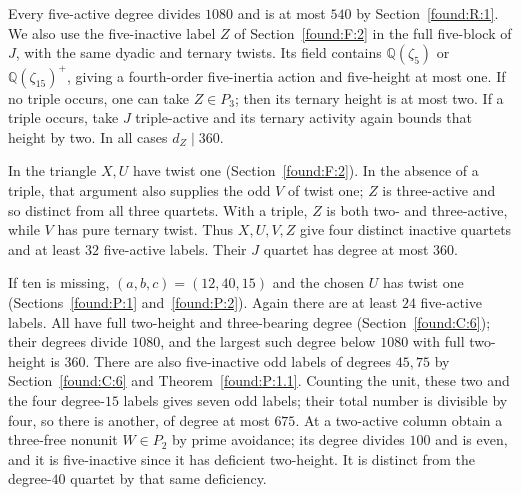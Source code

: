 \documentclass[11pt,a4paper]{article}
\numberwithin{equation}{section}
\theoremstyle{remark}
\begin{document}
Every five-active degree divides $1080$ and is at most $540$ by Section~\ref{found:R:1}. We also use the five-inactive label $Z$ of Section~\ref{found:F:2} in the full five-block of $J$, with
the same dyadic and ternary twists. Its field contains $\mathbb Q(\zeta_5)$
or $\mathbb Q(\zeta_{15})^+$, giving a fourth-order five-inertia action and
five-height at most one. If no triple occurs, one can take $Z\in P_3$;
then its ternary height is at most two. If a triple occurs, take $J$
triple-active and its ternary activity again bounds that height by two.
In all cases $d_Z\mid360$.

In the triangle $X,U$ have twist one (Section~\ref{found:F:2}). In the absence of a
triple, that argument also supplies the odd $V$ of twist one; $Z$ is
three-active and so distinct from all three quartets. With a triple,
$Z$ is both two- and three-active, while $V$ has pure ternary twist.
Thus $X,U,V,Z$ give four distinct inactive quartets and at least $32$
five-active labels. Their $J$ quartet has degree at most $360$.

If ten is missing, $(a,b,c)=(12,40,15)$ and the chosen $U$ has twist
one (Sections~\ref{found:P:1} and~\ref{found:P:2}). Again there are at least $24$ five-active
labels. All have full two-height and three-bearing degree (Section~\ref{found:C:6});
their degrees divide $1080$, and the largest such degree below $1080$
with full two-height is $360$. There are also five-inactive odd labels
of degrees $45,75$ by Section~\ref{found:C:6} and Theorem~\ref{found:P:1.1}. Counting the
unit, these two and the four degree-$15$ labels gives seven odd labels;
their total number is divisible by four, so there is another, of degree
at most $675$. At a two-active column obtain a three-free nonunit
$W\in P_2$ by prime avoidance; its degree divides $100$ and is even,
and it is five-inactive since it has deficient two-height. It is distinct
from the degree-$40$ quartet by that same deficiency. 
\end{document}
